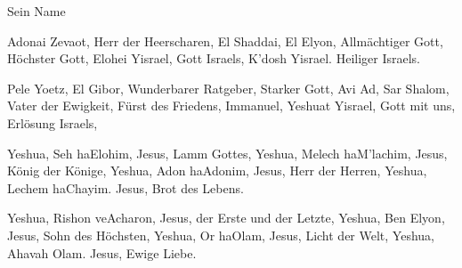 
Sein Name

Adonai   Zevaot, 			 Herr der Heerscharen,
El Shaddai,  El Elyon, 		         Allmächtiger Gott, Höchster Gott,
Elohei Yisrael, 			 Gott Israels,
K'dosh Yisrael. 			 Heiliger Israels.

Pele Yoetz, El Gibor, 			 Wunderbarer Ratgeber, Starker Gott,
Avi Ad, Sar Shalom, 			 Vater der Ewigkeit, Fürst des Friedens,
Immanuel, Yeshuat Yisrael, 		 Gott mit uns, Erlösung Israels,

Yeshua, Seh haElohim, 		         Jesus, Lamm Gottes,
Yeshua, Melech haM'lachim, 	         Jesus, König der Könige,
Yeshua, Adon haAdonim, 		         Jesus, Herr der Herren,
Yeshua, Lechem haChayim. 	         Jesus, Brot des Lebens.

Yeshua, Rishon veAcharon, 	         Jesus, der Erste und der Letzte,
Yeshua, Ben Elyon, 		         Jesus, Sohn des Höchsten,
Yeshua, Or haOlam, 		         Jesus, Licht der Welt,
Yeshua, Ahavah Olam. 		         Jesus, Ewige Liebe.
